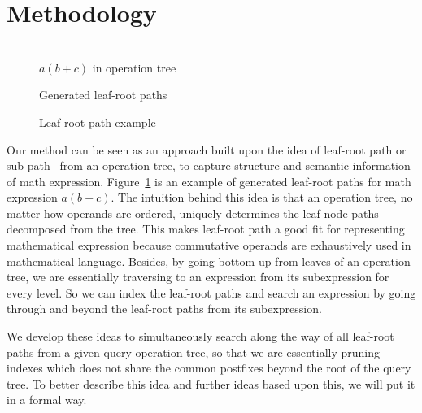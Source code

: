\documentclass{acm_proc_article-sp}
\begin{document}
\section{Methodology}
\begin{figure}
\begin{minipage}[b]{1.60in}
\begin{center}
\\$a(b+c)$ in operation tree
\end{center}
\end{minipage}
\hspace*{0in}
\begin{minipage}[b]{1.60in}
\begin{center}
Generated leaf-root paths
\end{center}
\end{minipage}
\caption{Leaf-root path example}\label{oprtreeExample}
\end{figure}
Our method can be seen as an approach built upon the idea of leaf-root path or sub-path~\cite{signifjap,MathMLleafroot,signfused,sefobyfo} from an operation tree, to capture structure and semantic information of math expression. 
Figure~\ref{oprtreeExample} is an example of generated leaf-root paths for math expression $a(b+c)$.
The intuition behind this idea is that an operation tree, no matter how operands are ordered, uniquely determines the leaf-node paths decomposed from the tree.
This makes leaf-root path a good fit for representing mathematical expression because commutative operands are exhaustively used in mathematical language.
Besides, by going bottom-up from leaves of an operation tree, we are essentially traversing to an expression from its subexpression for every level. 
So we can index the leaf-root paths and search an expression by going through and beyond the leaf-root paths from its subexpression.

We develop these ideas to simultaneously search along the way of all leaf-root paths from a given query operation tree, so that we are essentially pruning indexes which does not share the common postfixes beyond the root of the query tree.
To better describe this idea and further ideas based upon this, we will put it in a formal way.
\end{document}
